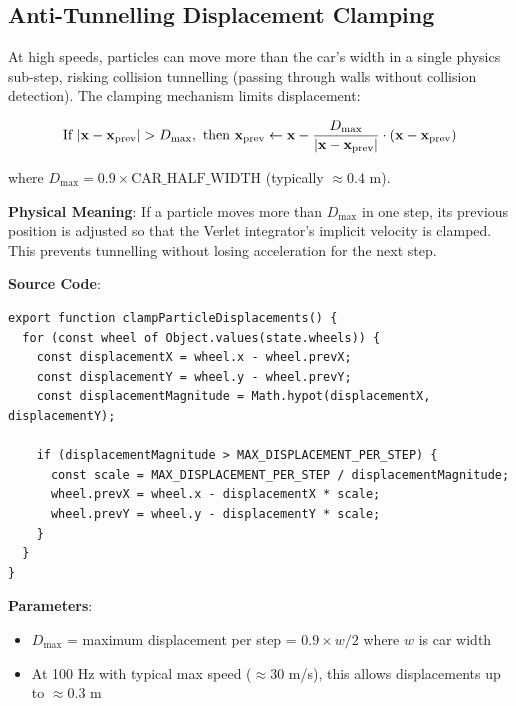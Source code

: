 \subsection{Anti-Tunnelling Displacement Clamping}

At high speeds, particles can move more than the car's width in a single physics sub-step, risking collision tunnelling (passing through walls without collision detection). The clamping mechanism limits displacement:

\begin{equation}
  \text{If } |\mathbf{x} - \mathbf{x}_{\text{prev}}| > D_{\text{max}}, \text{ then } \mathbf{x}_{\text{prev}} \leftarrow \mathbf{x} - \frac{D_{\text{max}}}{|\mathbf{x} - \mathbf{x}_{\text{prev}}|} \cdot (\mathbf{x} - \mathbf{x}_{\text{prev}})
  \label{eq:displacement-clamp}
\end{equation}

where $D_{\text{max}} = 0.9 \times \text{CAR\_HALF\_WIDTH}$ (typically $\approx 0.4$ m).

\textbf{Physical Meaning}: If a particle moves more than $D_{\text{max}}$ in one step, its previous position is adjusted so that the Verlet integrator's implicit velocity is clamped. This prevents tunnelling without losing acceleration for the next step.

\textbf{Source Code}: 

\begin{lstlisting}[caption={Anti-tunnelling displacement clamping}]
export function clampParticleDisplacements() {
  for (const wheel of Object.values(state.wheels)) {
    const displacementX = wheel.x - wheel.prevX;
    const displacementY = wheel.y - wheel.prevY;
    const displacementMagnitude = Math.hypot(displacementX, displacementY);

    if (displacementMagnitude > MAX_DISPLACEMENT_PER_STEP) {
      const scale = MAX_DISPLACEMENT_PER_STEP / displacementMagnitude;
      wheel.prevX = wheel.x - displacementX * scale;
      wheel.prevY = wheel.y - displacementY * scale;
    }
  }
}
\end{lstlisting}

\textbf{Parameters}:
\begin{itemize}
  \item $D_{\text{max}}$ = maximum displacement per step = $0.9 \times w/2$ where $w$ is car width
  \item At 100 Hz with typical max speed ($\approx 30$ m/s), this allows displacements up to $\approx 0.3$ m
\end{itemize}

